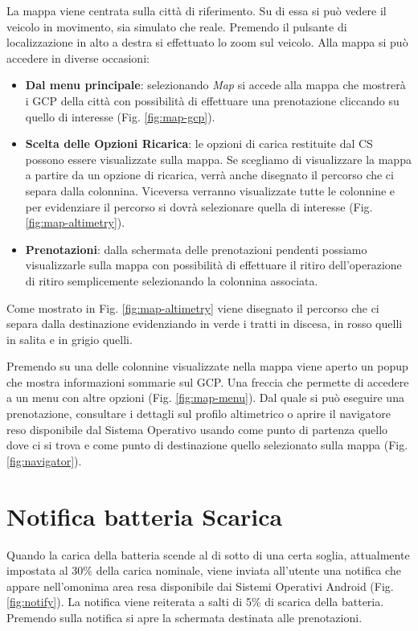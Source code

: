 La mappa viene centrata sulla città di riferimento. Su di essa si può vedere il veicolo in movimento, sia simulato che reale. Premendo il pulsante di localizzazione in alto a destra si effettuato lo zoom sul veicolo. Alla mappa si può accedere in diverse occasioni:

\begin{itemize}
	\item \textbf{Dal menu principale}: selezionando \emph{Map} si accede alla mappa che mostrerà i GCP della città con possibilità di effettuare una prenotazione cliccando su quello di interesse (Fig. \ref{fig:map-gcp}).
	\item \textbf{Scelta delle Opzioni Ricarica}: le opzioni di carica restituite dal CS possono essere visualizzate sulla mappa. Se scegliamo di visualizzare la mappa a partire da un opzione di ricarica, verrà anche disegnato il percorso che ci separa dalla colonnina. Viceversa verranno visualizzate tutte le colonnine e per evidenziare il percorso si dovrà selezionare quella di interesse (Fig. \ref{fig:map-altimetry}). 
	\item \textbf{Prenotazioni}: dalla schermata delle prenotazioni pendenti possiamo visualizzarle sulla mappa con possibilità di effettuare il ritiro dell'operazione di ritiro semplicemente selezionando la colonnina associata.
\end{itemize}

Come mostrato in Fig. \ref{fig:map-altimetry} viene disegnato il percorso che ci separa dalla destinazione evidenziando in verde i tratti in discesa, in rosso quelli in salita e in grigio quelli.

Premendo su una delle colonnine visualizzate nella mappa viene aperto un popup che mostra informazioni sommarie sul GCP. Una freccia che permette di accedere a un menu con altre opzioni (Fig. \ref{fig:map-menu}). Dal quale si può eseguire una prenotazione, consultare i dettagli sul profilo altimetrico o aprire il navigatore reso disponibile dal Sistema Operativo usando come punto di partenza quello dove ci si trova e come punto di destinazione quello selezionato sulla mappa (Fig. \ref{fig:navigator}).

\section{Notifica batteria Scarica}

Quando la carica della batteria scende al di sotto di una certa soglia, attualmente impostata al 30\% della carica nominale, viene inviata all'utente una notifica che appare nell'omonima area resa disponibile dai Sistemi Operativi Android (Fig. \ref{fig:notify}). La notifica viene reiterata a salti di 5\% di scarica della batteria. Premendo sulla notifica si apre la schermata destinata alle prenotazioni.

